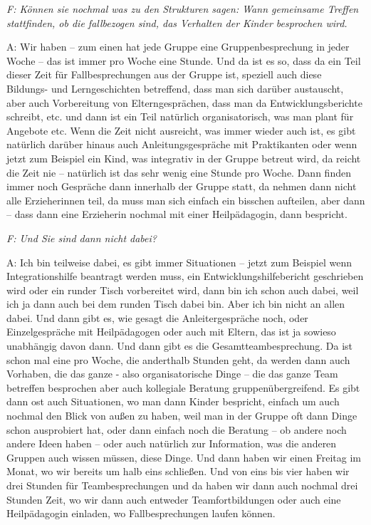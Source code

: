 \begin{linenumbers*}
\emph{F: Können sie nochmal was zu den Strukturen sagen: Wann gemeinsame Treffen stattfinden, ob die fallbezogen sind, das Verhalten der Kinder besprochen wird.}

A: Wir haben – zum einen hat jede Gruppe eine Gruppenbesprechung in jeder Woche – das ist immer pro Woche eine Stunde. Und da ist es so, dass da ein Teil dieser Zeit für Fallbesprechungen aus der Gruppe ist, speziell auch diese Bildungs- und Lerngeschichten betreffend, dass man sich darüber austauscht, aber auch Vorbereitung von Elterngesprächen, dass man da Entwicklungsberichte schreibt, etc. und dann ist ein Teil natürlich organisatorisch, was man plant für Angebote etc. Wenn die Zeit nicht ausreicht, was immer wieder auch ist, es gibt natürlich darüber hinaus auch Anleitungsgespräche mit Praktikanten oder wenn jetzt zum Beispiel ein Kind, was integrativ in der Gruppe betreut wird, da reicht die Zeit nie – natürlich ist das sehr wenig eine Stunde pro Woche. Dann finden immer noch Gespräche dann innerhalb der Gruppe statt, da nehmen dann nicht alle Erzieherinnen teil, da muss man sich einfach ein bisschen aufteilen, aber dann – dass  dann eine Erzieherin nochmal mit einer Heilpädagogin, dann bespricht.

\emph{F: Und Sie sind dann nicht dabei?}

A: Ich bin teilweise dabei, es gibt immer Situationen – jetzt zum Beispiel wenn Integrationshilfe beantragt werden muss, ein Entwicklungshilfebericht geschrieben wird oder ein runder Tisch vorbereitet wird, dann bin ich schon auch dabei, weil ich ja dann auch bei dem runden Tisch dabei bin. Aber ich bin nicht an allen dabei. Und dann gibt es, wie gesagt die Anleitergespräche noch, oder Einzelgespräche mit Heilpädagogen oder auch mit Eltern, das ist ja sowieso unabhängig davon dann. Und dann gibt es die Gesamtteambesprechung. Da ist schon mal eine pro Woche, die anderthalb Stunden geht, da werden dann auch Vorhaben, die das ganze - also organisatorische Dinge – die das ganze Team betreffen besprochen aber auch kollegiale Beratung gruppenübergreifend. Es gibt dann ost auch Situationen, wo man dann Kinder bespricht, einfach um auch nochmal den Blick von außen zu haben, weil man in der Gruppe oft dann Dinge schon ausprobiert hat, oder dann einfach noch die Beratung – ob andere noch andere Ideen haben – oder auch natürlich zur Information, was die anderen Gruppen auch wissen müssen, diese Dinge. Und dann haben wir einen Freitag im Monat, wo wir bereits um halb eins schließen. Und von eins bis vier haben wir drei Stunden für Teambesprechungen und da haben wir dann auch nochmal drei Stunden Zeit, wo wir dann auch entweder Teamfortbildungen oder auch eine Heilpädagogin einladen, wo Fallbesprechungen laufen können.


\end{linenumbers*}
